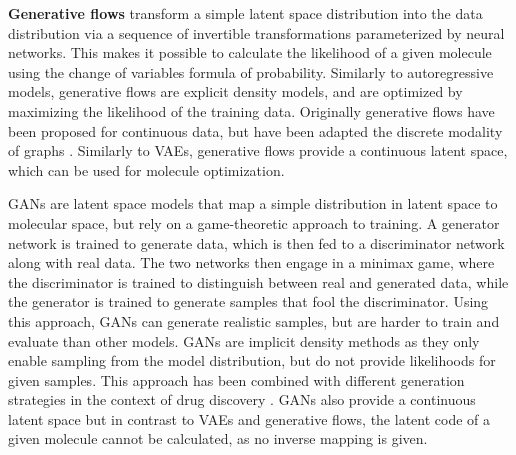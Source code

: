 \textbf{Generative flows} \citep{rezendeVariationalInferenceNormalizing2016} transform a simple
latent space distribution into the data distribution via a sequence of invertible transformations
parameterized by neural networks. This makes it possible to calculate the likelihood of a given
molecule using the change of variables formula of probability. Similarly to autoregressive models,
generative flows are explicit density models, and are optimized by maximizing the likelihood of the
training data. Originally generative flows have been proposed for continuous data, but have been
adapted the discrete modality of graphs
\citep{madhawaGraphNVPInvertibleFlow2019,satorrasEquivariantNormalizingFlows2022,shiGraphAFFlowbasedAutoregressive2020,kuznetsovMolGrowGraphNormalizing2021}.
Similarly to \acp{VAE}, generative flows provide a continuous latent space, which can be used for
molecule optimization.

\Acp{GAN} \citep{goodfellowGenerativeAdversarialNetworks2014} are latent space models that map a
simple distribution in latent space to molecular space, but rely on a game-theoretic approach to
training. A generator network is trained to generate data, which is then fed to a discriminator
network along with real data. The two networks then engage in a minimax game, where the
discriminator is trained to distinguish between real and generated data, while the generator is
trained to generate samples that fool the discriminator. Using this approach, \acp{GAN} can generate
realistic samples, but are harder to train and evaluate than other models. \Acp{GAN} are implicit
density methods as they only enable sampling from the model distribution, but do not provide
likelihoods for given samples. This approach has been combined with different generation strategies
in the context of drug discovery
\citep{decaoMolGANImplicitGenerative2018,kadurinDruGANAdvancedGenerative2017,guimaraesObjectiveReinforcedGenerativeAdversarial2017,mendez-lucioNovoGenerationHitlike2018,tangMolecularGenerativeAdversarial2024}.
\acp{GAN} also provide a continuous latent space but in contrast to \acp{VAE} and generative flows,
the latent code of a given molecule cannot be calculated, as no inverse mapping is given.

